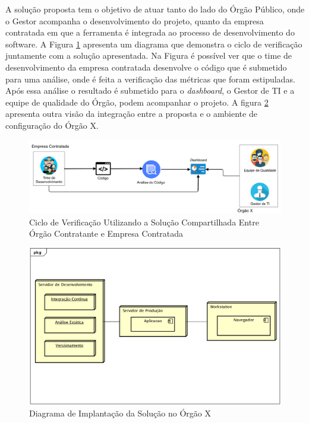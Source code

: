 A solução proposta tem o objetivo de atuar tanto do lado do Órgão Público, onde o Gestor acompanha o desenvolvimento do projeto, quanto da empresa contratada em que a ferramenta é integrada ao processo de desenvolvimento do software. A Figura \ref{img:ciclo_ver} apresenta um diagrama que demonstra o ciclo de verificação juntamente com a solução apresentada. Na Figura é possível ver que o time de desenvolvimento da empresa contratada desenvolve o código que é submetido para uma análise, onde é feita a verificação das métricas que foram estipuladas. Após essa análise o resultado é submetido para o \textit{dashboard},  o Gestor de TI e a equipe de qualidade do Órgão, podem acompanhar o projeto. A figura \ref{img:diagram_implantacao} apresenta outra visão da integração entre a proposta e o ambiente de configuração do Órgão X.

\graphicspath{{figuras/}}
\begin{figure}[!]
\centering
\includegraphics[scale=0.30]{proc_ver.png}
\caption{Ciclo de Verificação Utilizando a Solução Compartilhada Entre Órgão Contratante e Empresa Contratada}
\label{img:ciclo_ver}
\end{figure}

\graphicspath{{figuras/}}
\begin{figure}[!]
\centering
\includegraphics[scale=0.60]{diagrama_implantacao}
\caption{Diagrama de Implantação da Solução no Órgão X} 
\label{img:diagram_implantacao}
\end{figure}


